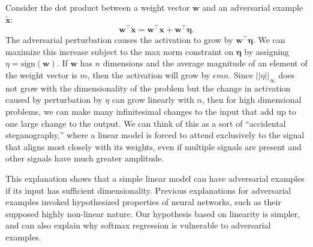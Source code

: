\documentclass{article} %
\def\eps{{\epsilon}}
\def\veta{{\bm{\eta}}}
\def\vw{{\bm{w}}}
\def\vx{{\bm{x}}}
\begin{document}
Consider the dot product between a weight vector $\vw$ and an adversarial example $\tilde{\vx}$:
\[ \vw^\top \tilde{\vx} = \vw^\top \vx + \vw^\top \veta. \]
The adversarial perturbation causes the activation to grow by $\vw^\top \veta$.%
We can maximize this increase subject to the max norm constraint on $\veta$ by assigning
$\eta = \text{sign}(\vw)$. If $\vw$ has $n$ dimensions and the average magnitude of an element
of the weight vector is $m$, then the activation will grow by $\eps m n$.
%
Since $||\eta||_\infty$ does not grow with the dimensionality of the problem but the change in activation
caused by perturbation by $\eta$ can grow linearly with $n$, then for high dimensional problems, we can make many
infinitesimal changes to the input that add up to one large change to the output.
We can think of this as a sort of ``accidental steganography,'' where a linear model is forced to attend
exclusively to the signal that aligns most closely with its weights, even if multiple signals are
present and other signals have much greater amplitude.

This explanation shows that a simple linear model can have adversarial examples if its input has
sufficient dimensionality. Previous explanations for adversarial examples invoked hypothesized
properties of neural networks, such as their supposed highly non-linear nature.
Our hypothesis based on linearity is simpler, and can also explain why softmax regression is vulnerable
to adversarial examples.
\end{document}

